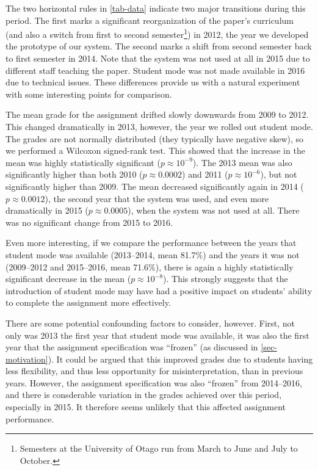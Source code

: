 \documentclass[sigconf, authordraft, capitalise]{acmart}
\begin{document}
The two horizontal rules in \cref{tab-data} indicate two major transitions during this period. The first marks a significant reorganization of the paper's curriculum (and also a switch from first to second semester\footnote{Semesters at the University of Otago run from March to June and July to October.}) in 2012, the year we developed the prototype of our system. The second marks a shift from second semester back to first semester in 2014. Note that the system was not used at all in 2015 due to different staff teaching the paper. Student mode was not made available in 2016 due to technical issues. These differences provide us with a natural experiment with some interesting points for comparison.

The mean grade for the assignment drifted slowly downwards from 2009 to 2012. This changed dramatically in 2013, however, the year we rolled out student mode. The grades are not normally distributed (they typically have negative skew), so we performed a Wilcoxon signed-rank test. This showed that the increase in the mean was highly statistically significant (\(p \approx 10^{-9}\)). The 2013 mean was also significantly higher than both 2010 (\(p \approx 0.0002\)) and 2011 (\(p \approx 10^{-6}\)), but not significantly higher than 2009. The mean decreased significantly again in 2014 (\(p \approx 0.0012\)), the second year that the system was used, and even more dramatically in 2015 (\(p \approx 0.0005\)), when the system was not used at all. There was no significant change from 2015 to 2016.

Even more interesting, if we compare the performance between the years that student mode was available (2013--2014, mean 81.7\%) and the years it was not (2009--2012 and 2015--2016, mean 71.6\%), there is again a highly statistically significant decrease in the mean (\(p \approx 10^{-8}\)). This strongly suggests that the introduction of student mode may have had a positive impact on students' ability to complete the assignment more effectively.

There are some potential confounding factors to consider, however. First, not only was 2013 the first year that student mode was available, it was also the first year that the assignment specification was ``frozen'' (as discussed in \cref{sec-motivation}). It could be argued that this improved grades due to students having less flexibility, and thus less opportunity for misinterpretation, than in previous years. However, the assignment specification was also ``frozen'' from 2014--2016, and there is consderable variation in the grades achieved over this period, especially in 2015. It therefore seems unlikely that this affected assignment performance.
\end{document}
